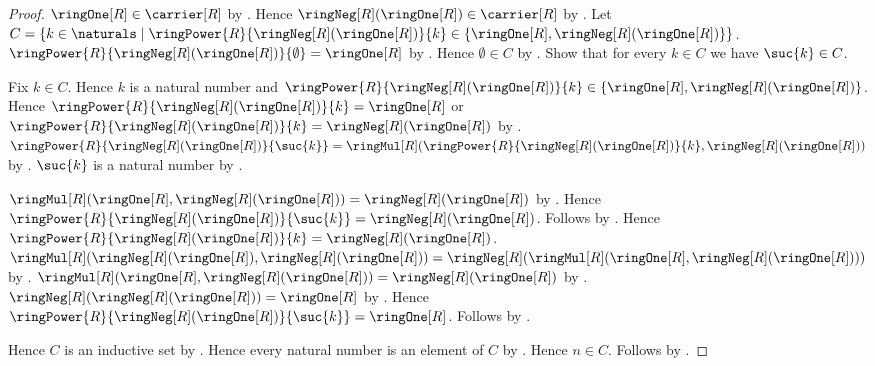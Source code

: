 \begin{proof}
    $\ringOne[R]\in\carrier[R]$ by .
    Hence $\ringNeg[R](\ringOne[R])\in\carrier[R]$ by .
    Let $C=\{k\in\naturals\mid
        \ringPower{R}{\ringNeg[R](\ringOne[R])}{k}
            \in\{\ringOne[R],\ringNeg[R](\ringOne[R])\}\}$.
    $\ringPower{R}{\ringNeg[R](\ringOne[R])}{\emptyset}=\ringOne[R]$ by
        .
    Hence $\emptyset\in C$ by .
    Show that for every $k\in C$ we have $\suc{k}\in C$.
    \begin{subproof}
        Fix $k\in C$.
        Hence $k$ is a natural number and
            $\ringPower{R}{\ringNeg[R](\ringOne[R])}{k}
                \in\{\ringOne[R],\ringNeg[R](\ringOne[R])\}$.
        Hence $\ringPower{R}{\ringNeg[R](\ringOne[R])}{k}=\ringOne[R]$ or
            $\ringPower{R}{\ringNeg[R](\ringOne[R])}{k}
                =\ringNeg[R](\ringOne[R])$ by .
        $\ringPower{R}{\ringNeg[R](\ringOne[R])}{\suc{k}}
            =\ringMul[R](
                \ringPower{R}{\ringNeg[R](\ringOne[R])}{k},
                \ringNeg[R](\ringOne[R]))$ by
            .
        $\suc{k}$ is a natural number by .
        \begin{byCase}
                $\ringMul[R](\ringOne[R],\ringNeg[R](\ringOne[R]))
                    =\ringNeg[R](\ringOne[R])$ by
                    .
                Hence
                    $\ringPower{R}{\ringNeg[R](\ringOne[R])}{\suc{k}}
                        =\ringNeg[R](\ringOne[R])$.
                Follows by .
                Hence $\ringPower{R}{\ringNeg[R](\ringOne[R])}{k}
                    =\ringNeg[R](\ringOne[R])$.
                $\ringMul[R](\ringNeg[R](\ringOne[R]),
                        \ringNeg[R](\ringOne[R]))
                    =\ringNeg[R](\ringMul[R](\ringOne[R],
                        \ringNeg[R](\ringOne[R])))$ by
                    .
                $\ringMul[R](\ringOne[R],\ringNeg[R](\ringOne[R]))
                    =\ringNeg[R](\ringOne[R])$ by
                    .
                $\ringNeg[R](\ringNeg[R](\ringOne[R]))=\ringOne[R]$ by
                    .
                Hence
                    $\ringPower{R}{\ringNeg[R](\ringOne[R])}{\suc{k}}
                        =\ringOne[R]$.
                Follows by .
        \end{byCase}
    \end{subproof}
    Hence $C$ is an inductive set by .
    Hence every natural number is an element of $C$ by
        .
    Hence $n\in C$.
    Follows by .
\end{proof}

